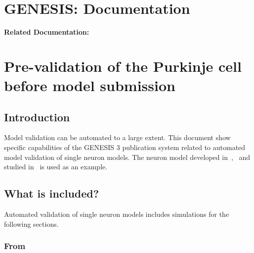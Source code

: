 \documentclass[12pt]{article}
\begin{document}
\section*{GENESIS: Documentation}

{\bf Related Documentation:}

\section*{Pre-validation of the Purkinje cell before model submission}

\subsection*{Introduction}

Model validation can be automated to a large extent.  This document
show specific capabilities of the GENESIS 3 publication system related
to automated model validation of single neuron models.  The neuron
model developed in~\cite{De-Schutter-E:1994vn},~\cite{E:1994hc} and
studied in~\cite{schutter94:_simul_purkin} is used as an example.

\subsection*{What is included?}

Automated validation of single neuron models includes simulations for
the following sections.


\subsubsection*{From~\cite{De-Schutter-E:1994vn}}
\end{document}
